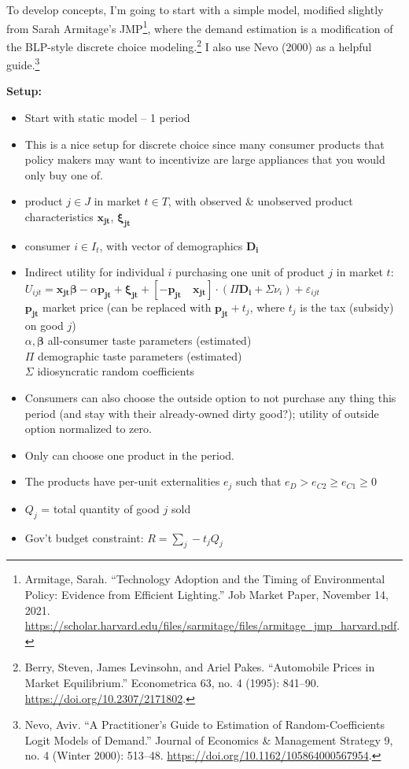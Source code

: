 \documentclass[12pt]{article}
\begin{document}
To develop concepts, I'm going to start with a simple model, modified slightly from Sarah Armitage's JMP\footnote{Armitage, Sarah. “Technology Adoption and the Timing of Environmental Policy: Evidence from Eﬃcient Lighting.” Job Market Paper, November 14, 2021. \url{https://scholar.harvard.edu/files/sarmitage/files/armitage_jmp_harvard.pdf}.}, where the demand estimation is a modification of the BLP-style discrete choice modeling.\footnote{Berry, Steven, James Levinsohn, and Ariel Pakes. “Automobile Prices in Market Equilibrium.” Econometrica 63, no. 4 (1995): 841–90. \url{https://doi.org/10.2307/2171802}.} I also use Nevo (2000) as a helpful guide.\footnote{Nevo, Aviv. “A Practitioner’s Guide to Estimation of Random-Coefficients Logit Models of Demand.” Journal of Economics \& Management Strategy 9, no. 4 (Winter 2000): 513–48. \url{https://doi.org/10.1162/105864000567954}.}

\def\D{\boldsymbol{D_i}}
\def\x{\boldsymbol{x_{jt}}}
\def\p{\boldsymbol{p_{jt}}}
\def\c{\boldsymbol{\xi_{jt}}}
\def\U{U_{ijt}}
\def\b{\boldsymbol{\beta}}
\def\sumi{\sum\limits_i} 
\def\sumj{\sum\limits_j}
\def\sumk{\sum\limits_k}
\textbf{Setup:}
\begin{itemize}
    \item Start with static model -- 1 period
    \item This is a nice setup for discrete choice since many consumer products that policy makers may want to incentivize are large appliances that you would only buy one of.
    \item product $j\in J$ in market $t\in T$, with observed \& unobserved product characteristics $\x$, $\c$
    \item consumer $i\in I_t$, with vector of demographics $\D$
    \item Indirect utility for individual $i$ purchasing one unit of product $j$ in market $t$:\\
    $\U=\x\b  - \alpha\p +\c+ [-\p\quad \x]\cdot(\Pi \D +\Sigma\nu_i) + \varepsilon_{ijt}$\\
    $\p$ market price (can be replaced with $\p +t_j$, where $t_j$ is the tax (subsidy) on good $j$) \\
    $\alpha, \b$ all-consumer taste parameters (estimated) \\
    $\Pi$ demographic taste parameters (estimated)\\
    $\Sigma$ idiosyncratic random coefficients
    \item Consumers can also choose the outside option to not purchase any thing this period (and stay with their already-owned dirty good?); utility of outside option normalized to zero.
    \item Only can choose one product in the period.
    \item The products have per-unit externalities $e_j$ such that 
    $e_D > e_{C2} \geq e_{C1} \geq0 $
    \item $Q_j$ = total quantity of good $j$ sold
    \item Gov't budget constraint: $R=\sum_j -t_j Q_j$
\end{itemize}
\end{document}
